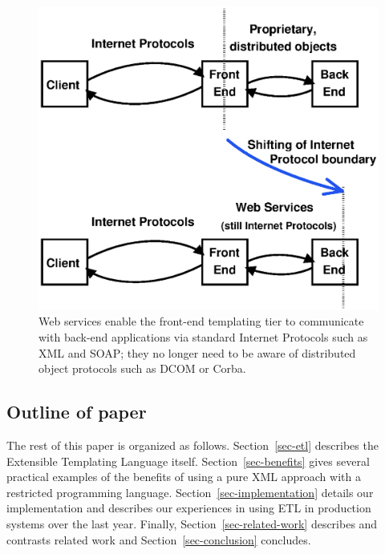 \documentclass{www2003-submission}
\newcommand{\secref}[1]{Section~\ref{sec-#1}}
\begin{document}
\begin{figure}[bt]
\begin{centering}
\includegraphics[width=1\linewidth]{web-service-ip-shift.eps}
\caption{Web services enable the front-end templating tier to
communicate with back-end applications via standard Internet Protocols
such as XML and SOAP; they no longer need to be aware of distributed
object protocols such as DCOM or Corba.\label{fig-ws-ip-shift}}
\end{centering}
\end{figure}


\subsection{Outline of paper}

The rest of this paper is organized as follows. \secref{etl} describes
the Extensible Templating Language itself. \secref{benefits} gives
several practical examples of the benefits of using a pure XML
approach with a restricted programming language.
\secref{implementation} details our implementation and
describes our experiences in using ETL in production systems over the
last year.  Finally, \secref{related-work} describes and contrasts
related work and \secref{conclusion} concludes.

\end{document}
